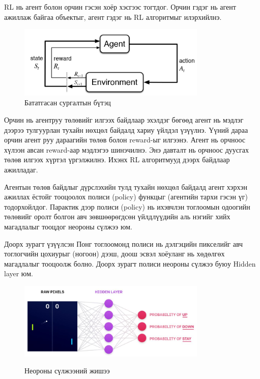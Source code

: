 \documentclass[12pt,A4]{report}
\begin{document}
RL нь агент болон орчин гэсэн хоёр хэсгээс тогтдог. Орчин гэдэг нь агент ажиллаж байгаа объектыг, агент гэдэг нь RL алгоритмыг илэрхийлнэ.

\begin{figure}[H]
\centering
\includegraphics[width=0.8\textwidth]{./images/rl}
\caption{Бататгасан сургалтын бүтэц}
\end{figure}

Орчин нь агентруу төлөвийг илгээх байдлаар эхэлдэг бөгөөд агент нь мэдлэг дээрээ тулгуурлан тухайн нөхцөл байдалд хариу үйлдэл үзүүлнэ. Үүний дараа орчин агент руу дараагийн төлөв болон reward-ыг илгээнэ. Агент нь орчноос хүлээн авсан reward-аар мэдлэгээ шинэчилнэ. Энэ давталт нь орчноос дуусгах төлөв илгээх хүртэл үргэлжилнэ. Ихэнх RL алгоритмууд дээрх байдлаар ажилладаг.

Агентын төлөв байдлыг дүрслэхийн тулд тухайн нөхцөл байдалд агент хэрхэн ажиллах ёстойг тооцоолох полиси (policy) функцыг (агентийн тархи гэсэн үг) тодорхойлдог. Парактик дээр полиси (policy) нь ихэвчлэн тоглоомын одоогийн төлөвийг оролт болгон авч зөвшөөрөгдсөн үйлдлүүдийн аль нэгийг хийх магадлалыг тооцдог неороны сүлжээ юм.

Доорх зурагт үзүүлсэн Понг тоглоомонд полиси нь дэлгэцийн пикселийг авч тоглогчийн цохиурыг (ногоон) дээш, доош эсвэл хоёуланг нь хөдөлгөх магадлалыг тооцоолж болно. Доорх зурагт полиси неороны сүлжээ буюу Hidden layer юм.  

\begin{figure}[H]
\centering
\href{https://openai.com/content/images/2017/03/first-graphic-1.png}{\includegraphics[width=0.8\textwidth]{./images/neural_network}}
\caption{Неороны сүлжээний жишээ}
\end{figure}
\end{document}

